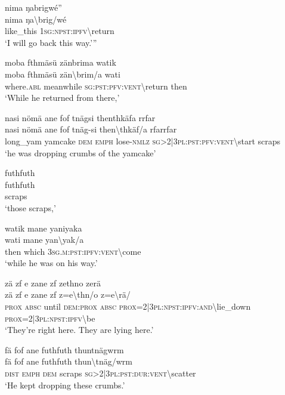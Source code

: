 \ea\label{ex:1:a3760}
nima ŋabrigwé''\\
\gll nima	ŋa{\textbackslash}brig/wé\\
     like\_this	1\textsc{sg}:\textsc{npst}:\textsc{ipfv}{\textbackslash}return\\
\glt `I will go back this way.'''
\z

\ea\label{ex:1:a3761}
moba fthmäsü zänbrima watik\\
\gll moba	fthmäsü	zän{\textbackslash}brim/a	wati\\
     where.\textsc{abl}	meanwhile	\textsc{sg}:\textsc{pst}:\textsc{pfv}:\textsc{vent}{\textbackslash}return	then\\
\glt `While he returned from there,'
\z

\ea\label{ex:1:a3762}
nasi nömä ane fof tnägsi thenthkäfa rrfar\\
\gll nasi	nömä	ane	fof	tnäg-si	then{\textbackslash}thkäf/a	rfarrfar\\
     long\_yam	yamcake	\textsc{dem}	\textsc{emph}	lose-\textsc{nmlz}	\textsc{sg}>2|3\textsc{pl}:\textsc{pst}:\textsc{pfv}:\textsc{vent}{\textbackslash}start	scraps\\
\glt `he was dropping crumbs of the yamcake'
\z

\ea\label{ex:1:a3763}
futhfuth\\
\gll futhfuth\\
     scraps\\
\glt `those scraps,'
\z

\ea\label{ex:1:a3764}
watik mane yaniyaka\\
\gll wati	mane	yan{\textbackslash}yak/a\\
     then	which	3\textsc{sg}.\textsc{m}:\textsc{pst}:\textsc{ipfv}:\textsc{vent}{\textbackslash}come\\
\glt `while he was on his way.'
\z

\ea\label{ex:1:a3765}
zä zf e zane zf zethno zerä\\
\gll zä	zf	e	zane	zf	z=e{\textbackslash}thn/o	z=e{\textbackslash}rä/\\
     \textsc{prox}	\textsc{absc}	until	\textsc{dem}:\textsc{prox}	\textsc{absc}	\textsc{prox}=2|3\textsc{pl}:\textsc{npst}:\textsc{ipfv}:\textsc{and}{\textbackslash}lie\_down	\textsc{prox}=2|3\textsc{pl}:\textsc{npst}:\textsc{ipfv}{\textbackslash}be\\
\glt `They're right here. They are lying here.'
\z

\ea\label{ex:1:a3766}
fä fof ane futhfuth thuntnägwrm\\
\gll fä	fof	ane	futhfuth	thun{\textbackslash}tnäg/wrm\\
     \textsc{dist}	\textsc{emph}	\textsc{dem}	scraps	\textsc{sg}>2|3\textsc{pl}:\textsc{pst}:\textsc{dur}:\textsc{vent}{\textbackslash}scatter\\
\glt `He kept dropping these crumbs.'
\z

